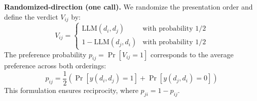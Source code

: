 \documentclass[11pt]{article}
\begin{document}
\noindent\textbf{Randomized-direction (one call).}
We randomize the presentation order and define the verdict $V_{ij}$ by:
\[
V_{ij} = \begin{cases} 
\text{LLM}(d_i, d_j) & \text{with probability } 1/2 \\
1 - \text{LLM}(d_j, d_i) & \text{with probability } 1/2
\end{cases}
\]
The preference probability $p_{ij} = \Pr[V_{ij} = 1]$ corresponds to the average preference across both orderings:
\[
p_{ij} = \frac{1}{2} \left( \Pr[y(d_i, d_j) = 1] + \Pr[y(d_j, d_i) = 0] \right)
\]
This formulation ensures reciprocity, where $p_{ji} = 1 - p_{ij}$.







\end{document}
